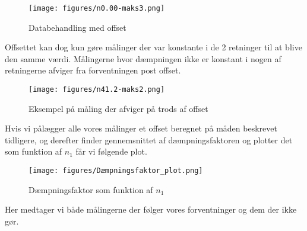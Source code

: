 \begin{figure}[htbp]
    \centering
    \texttt{[image: figures/n0.00-maks3.png]}
    \caption{Databehandling med offset}
    \label{fig:offset_graf}

\end{figure}

\noindent
Offsettet kan dog kun gøre målinger der var konstante i de 2 retninger til at blive den samme værdi. 
Målingerne hvor dæmpningen ikke er konstant i nogen af retningerne afviger fra forventningen post offset.

\begin{figure}[htbp]
    \centering
    \texttt{[image: figures/n41.2-maks2.png]}
    \caption{Eksempel på måling der afviger på trods af offset}
    \label{fig:dårlig_offset_graf}
\end{figure}

\noindent
Hvis vi pålægger alle vores målinger et offset beregnet på måden beskrevet tidligere, 
og derefter finder gennemsnittet af dæmpningsfaktoren og plotter det som funktion af $n_1$ får vi følgende plot.

\newpage

\begin{figure}[h]
    \centering
    \texttt{[image: figures/Dæmpningsfaktor\_plot.png]}
    \caption{Dæmpningsfaktor som funktion af $n_1$}
    \label{fig:dæmpningsfaktor}
\end{figure}

\noindent
Her medtager vi både målingerne der følger vores forventninger og dem der ikke gør. 
